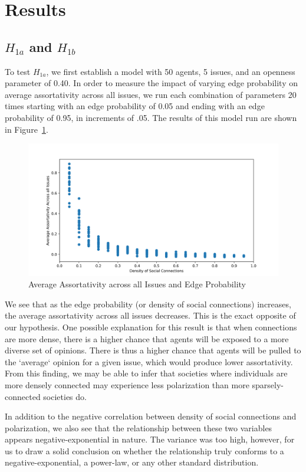 \section{Results}
\subsection{$H_{1a}$ and $H_{1b}$}

To test $H_{1a}$, we first establish a model with 50 agents, 5 issues, and an
openness parameter of 0.40. In order to measure the impact of varying edge
probability on average assortativity across all issues, we run each combination
of parameters 20 times starting with an edge probability of 0.05 and ending
with an edge probability of 0.95, in increments of .05. The results of this
model run are shown in Figure~\ref{H1a_plot}.

\begin{figure}
\centering
\includegraphics[width=1.0\columnwidth]{./Graphs/Assort_edge.png}
\caption{Average Assortativity across all Issues and Edge Probability}
\label{H1a_plot}
\end{figure}

We see that as the edge probability (or density of social connections)
increases, the average assortativity across all issues decreases. This is the
exact opposite of our hypothesis. One possible explanation for this result is
that when connections are more dense, there is a higher chance that agents will
be exposed to a more diverse set of opinions. There is thus a higher chance
that agents will be pulled to the `average` opinion for a given issue, which
would produce lower assortativity. From this finding, we may be able to infer
that societies where individuals are more densely connected may experience
less polarization than more sparsely-connected societies do.

In addition to the negative correlation between density of social connections
and polarization, we also see that the relationship between these two variables
appears negative-exponential in nature. The variance was too high, however, for
us to draw a solid conclusion on whether the relationship truly conforms to a
negative-exponential, a power-law, or any other standard distribution.

